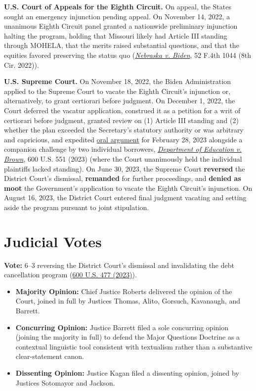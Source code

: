 \documentclass[12pt]{article}
\begin{document}
\textbf{U.S. Court of Appeals for the Eighth Circuit.} On appeal, the States sought an emergency injunction pending appeal. On November 14, 2022, a unanimous Eighth Circuit panel granted a nationwide preliminary injunction halting the program, holding that Missouri likely had Article III standing through MOHELA, that the merits raised substantial questions, and that the equities favored preserving the status quo (\href{https://law.justia.com/cases/federal/appellate-courts/ca8/22-3179/22-3179-2022-11-14.html}{\textit{Nebraska v. Biden}}, 52 F.4th 1044 (8th Cir. 2022)).

\textbf{U.S. Supreme Court.} On November 18, 2022, the Biden Administration applied to the Supreme Court to vacate the Eighth Circuit's injunction or, alternatively, to grant certiorari before judgment. On December 1, 2022, the Court deferred the vacatur application, construed it as a petition for a writ of certiorari before judgment, granted review on (1) Article III standing and (2) whether the plan exceeded the Secretary's statutory authority or was arbitrary and capricious, and expedited \href{https://www.oyez.org/cases/2022/22-506}{oral argument} for February 28, 2023 alongside a companion challenge by two individual borrowers, \href{https://www.supremecourt.gov/opinions/22pdf/600us1r57_o7kq.pdf}{\textit{Department of Education v. Brown}}, 600 U.S. 551 (2023) (where the Court unanimously held the individual plaintiffs lacked standing). On June 30, 2023, the Supreme Court \textbf{reversed} the District Court's dismissal, \textbf{remanded} for further proceedings, and \textbf{denied as moot} the Government's application to vacate the Eighth Circuit's injunction. On August 16, 2023, the District Court entered final judgment vacating and setting aside the program pursuant to joint stipulation.

\section{Judicial Votes}

\textbf{Vote:} 6--3 reversing the District Court's dismissal and invalidating the debt cancellation program (\href{https://www.supremecourt.gov/opinions/22pdf/600us1r56_1o13.pdf}{600 U.S. 477 (2023)}).

\begin{itemize}
  \item \textbf{Majority Opinion:} Chief Justice Roberts delivered the opinion of the Court, joined in full by Justices Thomas, Alito, Gorsuch, Kavanaugh, and Barrett.
  \item \textbf{Concurring Opinion:} Justice Barrett filed a sole concurring opinion (joining the majority in full) to defend the Major Questions Doctrine as a contextual linguistic tool consistent with textualism rather than a substantive clear-statement canon.
  \item \textbf{Dissenting Opinion:} Justice Kagan filed a dissenting opinion, joined by Justices Sotomayor and Jackson.
\end{itemize}
\end{document}
